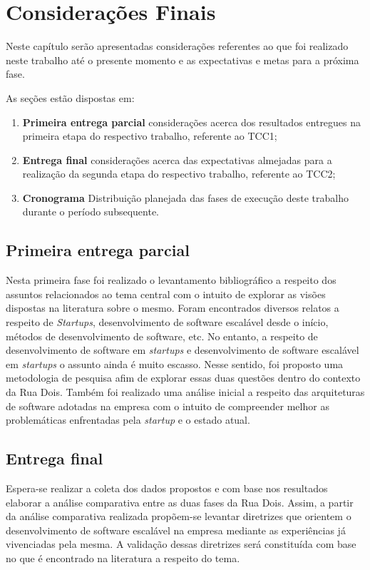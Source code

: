 \chapter{Considerações Finais}

Neste capítulo serão apresentadas considerações referentes ao que foi realizado
neste trabalho até o presente momento e as expectativas e metas para a próxima
fase.

  As seções estão dispostas em:

  \begin{enumerate}
    \item \textbf{Primeira entrega parcial} considerações acerca dos resultados
    entregues na primeira etapa do respectivo trabalho, referente ao \gls{TCC1};
    \item \textbf{Entrega final} considerações acerca das expectativas almejadas
    para a realização da segunda etapa do respectivo trabalho, referente ao \gls{TCC2};
    \item \textbf{Cronograma} Distribuição planejada das fases de execução deste
    trabalho durante o período subsequente.
  \end{enumerate}

\section{Primeira entrega parcial}
Nesta primeira fase foi realizado o levantamento bibliográfico a respeito dos assuntos
relacionados ao tema central com o intuito de explorar as visões dispostas na literatura
sobre o mesmo. Foram encontrados diversos relatos a respeito de \textit{Startups},
desenvolvimento de software escalável desde o início, métodos de desenvolvimento de
software, etc. No entanto, a respeito de desenvolvimento de software em \textit{startups}
e desenvolvimento de software escalável em \textit{startups} o assunto ainda é muito
escasso. Nesse sentido, foi proposto uma metodologia de pesquisa afim de explorar essas
duas questões dentro do contexto da Rua Dois. Também foi realizado uma análise inicial
a respeito das arquiteturas de software adotadas na empresa com o intuito de compreender
melhor as problemáticas enfrentadas pela \textit{startup} e o estado atual.

\section{Entrega final}
Espera-se realizar a coleta dos dados propostos e com base nos resultados elaborar a
análise comparativa entre as duas fases da Rua Dois. Assim, a partir da análise comparativa
realizada propõem-se levantar diretrizes que orientem o desenvolvimento de software escalável
na empresa mediante as experiências já vivenciadas pela mesma. A validação dessas diretrizes
será constituída com base no que é encontrado na literatura a respeito do tema.

